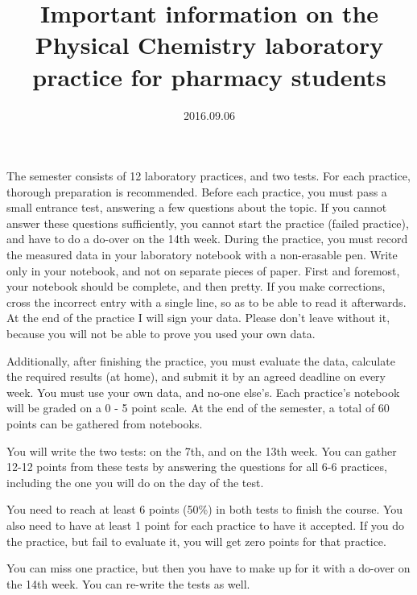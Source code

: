 \documentclass{article}
\begin{document}
\title{Important information on the Physical Chemistry laboratory practice for pharmacy students}
\date{2016.09.06}
\maketitle

The semester consists of 12 laboratory practices, and two tests. For each practice, thorough preparation is recommended. Before each practice, you must pass a small entrance test, answering a few questions about the topic. If you cannot answer these questions sufficiently, you cannot start the practice (failed practice), and have to do a do-over on the 14th week. During the practice, you must record the measured data in your laboratory notebook with a non-erasable pen. Write only in your notebook, and not on separate pieces of paper. First and foremost, your notebook should be complete, and then pretty. If you make corrections, cross the incorrect entry with a single line, so as to be able to read it afterwards. At the end of the practice I will sign your data. Please don't leave without it, because you will not be able to prove you used your own data.

Additionally, after finishing the practice, you must evaluate the data, calculate the required results (at home), and submit it by an agreed deadline on every week. You must use your own data, and no-one else's. Each practice's notebook will be graded on a 0 - 5 point scale. At the end of the semester, a total of 60 points can be gathered from notebooks. 

You will write the two tests: on the 7th, and on the 13th week. You can gather 12-12 points from these tests by answering the questions for all 6-6 practices, including the one you will do on the day of the test.

You need to reach at least 6 points (50\%) in both tests to finish the course. You also need to have at least 1 point for each practice to have it accepted. If you do the practice, but fail to evaluate it, you will get zero points for that practice.

You can miss one practice, but then you have to make up for it with a do-over on the 14th week. You can re-write the tests as well.
\end{document}
